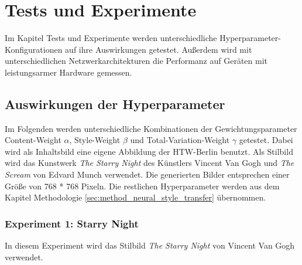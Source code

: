 \chapter{Tests und Experimente}
\label{cha:tests}

Im Kapitel Tests und Experimente werden unterschiedliche Hyperparameter-Konfigurationen auf ihre Auswirkungen getestet. Außerdem wird mit unterschiedlichen Netzwerkarchitekturen die Performanz auf Geräten mit leistungsarmer Hardware gemessen.

\section{Auswirkungen der Hyperparameter}

Im Folgenden werden unterschiedliche Kombinationen der Gewichtungsparameter Content-Weight $ \alpha $, Style-Weight $ \beta $ und Total-Variation-Weight $ \gamma $ getestet. Dabei wird als Inhaltsbild  eine eigene Abbildung der HTW-Berlin benutzt. Als Stilbild wird das Kunstwerk \textit{The Starry Night} des Künstlers Vincent Van Gogh und \textit{The Scream} von Edvard Munch verwendet. Die generierten Bilder entsprechen einer Größe von 768 * 768 Pixeln. Die restlichen Hyperparameter werden aus dem Kapitel Methodologie \ref{sec:method_neural_style_transfer} übernommen.

\pagebreak

\subsection{Experiment 1: Starry Night}

In diesem Experiment wird das Stilbild \textit{The Starry Night} von Vincent Van Gogh verwendet.

